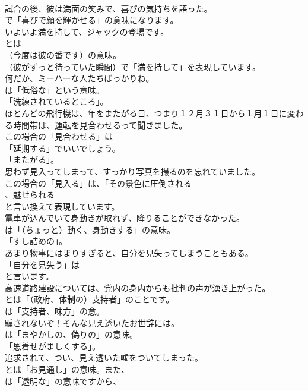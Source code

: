 \documentclass[8pt]{extreport}
\begin{document}
\begin{CJK}{UTF8}{min}
\\	試合の後、彼は満面の笑みで、喜びの気持ちを語った。 
\\	で「喜びで顔を輝かせる」の意味になります。	
\\	いよいよ満を持して、ジャックの登場です。 
\\	とは
\\	（今度は彼の番です）の意味。
\\	（彼がずっと待っていた瞬間）で「満を持して」を表現しています。	
\\	何だか、ミーハーな人たちばっかりね。 
\\	は「低俗な」という意味。
\\	「洗練されているところ」。	
\\	ほとんどの飛行機は、年をまたがる日、つまり１２月３１日から１月１日に変わる時間帯は、運転を見合わせるって聞きました。 
\\	この場合の「見合わせる」は
\\	「延期する」でいいでしょう。
\\	「またがる」。	
\\	思わず見入ってしまって、すっかり写真を撮るのを忘れていました。 
\\	この場合の「見入る」は、「その景色に圧倒される
\\	、魅せられる
\\	と言い換えて表現しています。	
\\	電車が込んでいて身動きが取れず、降りることができなかった。 
\\	は「（ちょっと）動く、身動きする」の意味。
\\	「すし詰めの」。	
\\	あまり物事にはまりすぎると、自分を見失ってしまうこともある。 
\\	「自分を見失う」は
\\	と言います。	
\\	高速道路建設については、党内の身内からも批判の声が湧き上がった。 
\\	とは「（政府、体制の）支持者」のことです。
\\	は「支持者、味方」の意。	
\\	騙されないぞ！そんな見え透いたお世辞には。 
\\	は「まやかしの、偽りの」の意味。
\\	「恩着せがましくする」。	
\\	追求されて、つい、見え透いた嘘をついてしまった。 
\\	とは「お見通し」の意味。また、
\\	は「透明な」の意味ですから、

\end{CJK}
\end{document}
